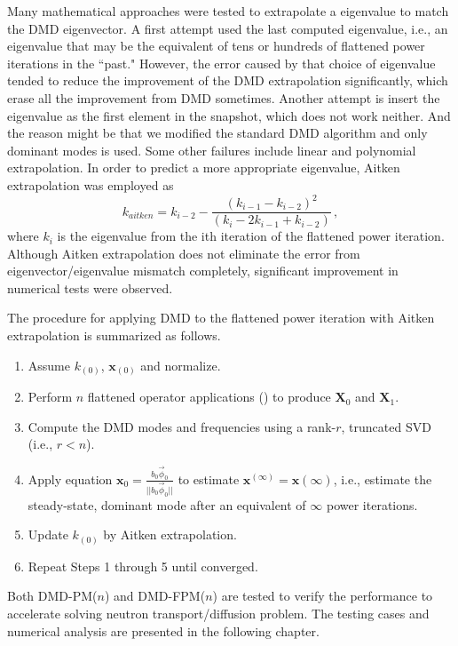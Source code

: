 Many mathematical approaches were tested to extrapolate a eigenvalue to match the DMD eigenvector. 
A first attempt used the last computed eigenvalue, i.e., an eigenvalue that may be the equivalent of tens or hundreds of flattened power iterations in the ``past."
However, the error caused by that choice of eigenvalue tended to reduce the improvement of the DMD extrapolation significantly, which erase all the improvement from DMD sometimes.
Another attempt is insert the eigenvalue as the first element in the snapshot, which does not work neither.
And the reason might be that we modified the standard DMD algorithm and only dominant modes is used.
Some other failures include linear and polynomial extrapolation. 
In order to predict a more appropriate eigenvalue, Aitken extrapolation was employed \cite{aitken_1927} as
\begin{equation}
k_{aitken} = k_{i-2} - \frac{(k_{i-1}-k_{i-2})^2}{(k_i - 2k_{i-1} + k_{i-2})}\, ,
\end{equation}
where $k_i$ is the eigenvalue from the ith iteration of the flattened power iteration.
Although Aitken extrapolation does not eliminate the error from eigenvector/eigenvalue mismatch completely, significant improvement in numerical tests were observed.

The procedure for applying DMD to the flattened power iteration with Aitken extrapolation is summarized as follows.

\begin{enumerate}
 \item Assume $k_{(0)}$, $\mathbf{x}_{(0)}$ and normalize.
 \item Perform $n$ flattened operator applications () to produce $\mathbf{X}_0$ and $\mathbf{X}_1$.
 \item Compute the DMD modes and frequencies using a rank-$r$, truncated  SVD (i.e., $r < n$).
 \item Apply equation $\mathbf{x}_{0}=\frac{b_0 \vec{\phi}^{}_0}{ ||b_0 \vec{\phi}^{}_0||}$ to estimate $\mathbf{x}^{(\infty)}=\mathbf{x}(\infty)$, i.e., estimate the steady-state, dominant mode after an equivalent of $\infty$ power iterations.
 \item Update $k_{(0)}$ by Aitken extrapolation.
 \item Repeat Steps 1 through 5 until converged.
\end{enumerate}

Both DMD-PM($n$) and DMD-FPM($n$) are tested to verify the performance to accelerate solving neutron transport/diffusion problem. The testing cases and numerical analysis are presented in the following chapter. 


